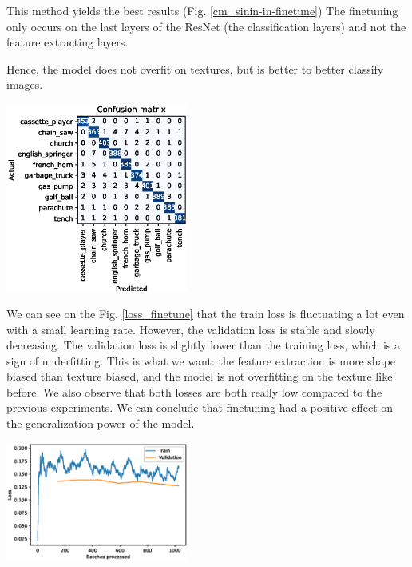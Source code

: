 \documentclass{article}
\begin{document}
This method yields the best results (Fig. \ref{cm_sinin-in-finetune}) The finetuning only occurs
on the last layers of the ResNet (the classification layers) and 
not the feature extracting layers. \medskip \par

\noindent
Hence, the model does not overfit on textures, but is better to better classify images. \medskip \par

\begin{center}
  \captionsetup{type=figure}
  \includegraphics[width = 0.45\textwidth]{imgs/sinin/finetune/fine_tune_confusion_matrix_0.974.eps}
  \label{cm_sinin-in-finetune}
\end{center}

\noindent
We can see on the Fig. \ref{loss_finetune} that the train loss is fluctuating a lot even with a small
learning rate. However, the validation loss is stable and slowly decreasing.
The validation loss is slightly lower than the training loss, which is a sign of underfitting. This is what we want:
the feature extraction is more shape biased than texture biased, and the model is not overfitting on the texture like
before.
We also observe that both losses are both really low compared to the previous experiments. 
We can conclude that finetuning had a positive effect on the generalization power of the model.

\begin{center}
  \captionsetup{type=figure}
  \includegraphics[width = 0.45\textwidth]{imgs/sinin/finetune/loss.eps}
  \label{loss_finetune}
\end{center}
\end{document}

